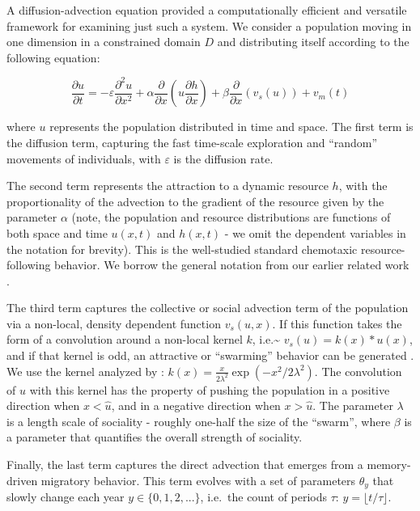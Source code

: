 \documentclass[utf8]{frontiersSCNS} %
\begin{document}
	A diffusion-advection equation provided a computationally efficient and versatile framework for examining just such a system. We consider a population moving in one dimension in a constrained domain $D$ and distributing itself according to the following equation:
	
	\begin{equation}\label{eq_mainmodel}
		{\frac{\partial u}{\partial t}} = -\varepsilon {\frac{\partial^2 u}{\partial x^2}} + 
		\alpha \frac{\partial}{\partial x}\left(u \frac{\partial h}{\partial x}\right) + 
		\beta \frac{\partial}{\partial x}\left(v_s(u)\right) + 
		v_m(t)
	\end{equation}
	
	\noindent where $u$ represents the population distributed in time and space. The first term is the diffusion term, capturing the fast time-scale exploration and ``random'' movements of individuals, with $\varepsilon$ is the diffusion rate.
	
	The second term represents the attraction to a dynamic resource $h$, with the proportionality of the advection to the gradient of the resource given by the parameter $\alpha$ (note, the population and resource distributions are functions of both space and time $u(x,t)$ and $h(x,t)$ - we omit the dependent variables in the notation for brevity). This is the well-studied standard chemotaxic resource-following behavior. We borrow the general notation from our earlier related work \citep{Fagan2017, Fagan2019}.
	
	The third term captures the collective or social advection term of the population via a non-local, density dependent function $v_s(u,x)$. If this function takes the form of a convolution around a non-local kernel $k$, i.e.\textasciitilde{} $v_s(u) = k(x) * u(x)$, and if that kernel is odd, an attractive or ``swarming'' behavior can be generated \citep{Mogilner1999}. We use the kernel analyzed by \citet{Mogilner1999}: $k(x) = \frac{x}{2\lambda^2} \exp(-x^2/2\lambda^2).$ The convolution of $u$ with this kernel has the property of pushing the population in a positive direction when $x < \widehat{u}$, and in a negative direction when $x > \widehat{u}$. The parameter $\lambda$ is a length scale of sociality - roughly one-half the size of the ``swarm'', where $\beta$ is a parameter that quantifies the overall strength of sociality.
	
	Finally, the last term captures the direct advection that emerges from a memory-driven migratory behavior. This term evolves with a set of parameters $\theta_y$ that slowly change each year $y \in \{0,1,2,...\}$, i.e.~the count of periods $\tau$: $y = \lfloor t/\tau \rfloor$.
	
\end{document}
